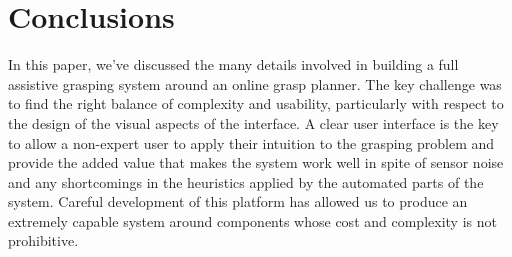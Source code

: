 
\section{Conclusions}
In this paper, we've discussed the many details involved in building a full assistive grasping system around an online grasp planner. The key challenge was to find the right balance of complexity and usability, particularly with respect to the design of the visual aspects of the interface. A clear user interface is the key to allow a non-expert user to apply their intuition to the grasping problem and provide the added value that makes the system work well in spite of sensor noise and any shortcomings in the heuristics applied by the automated parts of the system. Careful development of this platform has allowed us to produce an extremely capable system around components whose cost and complexity is not prohibitive. 

